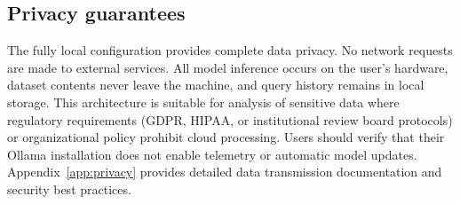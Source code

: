 \subsection{Privacy guarantees}

The fully local configuration provides complete data privacy. No
network requests are made to external services. All model inference
occurs on the user's hardware, dataset contents never leave the
machine, and query history remains in local storage. This architecture
is suitable for analysis of sensitive data where regulatory requirements
(GDPR, HIPAA, or institutional review board protocols) or organizational
policy prohibit cloud processing. Users should verify that their Ollama
installation does not enable telemetry or automatic model updates.
Appendix~\ref{app:privacy} provides detailed data transmission
documentation and security best practices.
